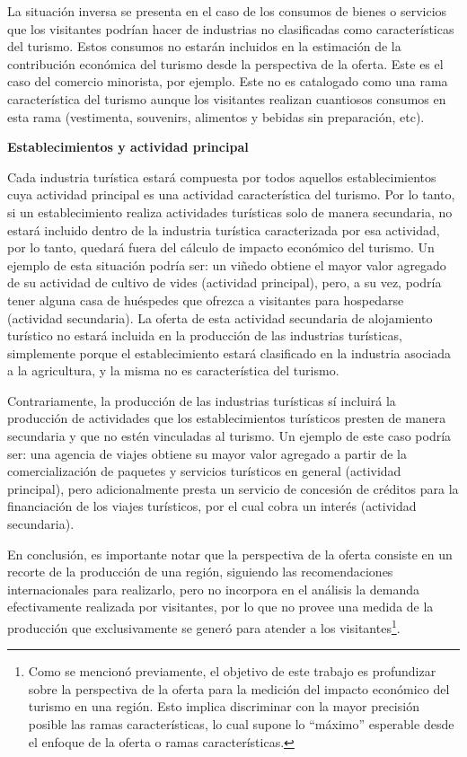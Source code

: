 \documentclass[
  openany]{book}
\begin{document}
La situación inversa se presenta en el caso de los consumos de bienes o servicios que los visitantes podrían hacer de industrias no clasificadas como características del turismo. Estos consumos no estarán incluidos en la estimación de la contribución económica del turismo desde la perspectiva de la oferta. Este es el caso del comercio minorista, por ejemplo. Este no es catalogado como una rama característica del turismo aunque los visitantes realizan cuantiosos consumos en esta rama (vestimenta, souvenirs, alimentos y bebidas sin preparación, etc).

\textbf{Establecimientos y actividad principal}

Cada industria turística estará compuesta por todos aquellos establecimientos cuya actividad principal es una actividad característica del turismo. Por lo tanto, si un establecimiento realiza actividades turísticas solo de manera secundaria, no estará incluido dentro de la industria turística caracterizada por esa actividad, por lo tanto, quedará fuera del cálculo de impacto económico del turismo. Un ejemplo de esta situación podría ser: un viñedo obtiene el mayor valor agregado de su actividad de cultivo de vides (actividad principal), pero, a su vez, podría tener alguna casa de huéspedes que ofrezca a visitantes para hospedarse (actividad secundaria). La oferta de esta actividad secundaria de alojamiento turístico no estará incluida en la producción de las industrias turísticas, simplemente porque el establecimiento estará clasificado en la industria asociada a la agricultura, y la misma no es característica del turismo.

Contrariamente, la producción de las industrias turísticas sí incluirá la producción de actividades que los establecimientos turísticos presten de manera secundaria y que no estén vinculadas al turismo. Un ejemplo de este caso podría ser: una agencia de viajes obtiene su mayor valor agregado a partir de la comercialización de paquetes y servicios turísticos en general (actividad principal), pero adicionalmente presta un servicio de concesión de créditos para la financiación de los viajes turísticos, por el cual cobra un interés (actividad secundaria).

En conclusión, es importante notar que la perspectiva de la oferta consiste en un recorte de la producción de una región, siguiendo las recomendaciones internacionales para realizarlo, pero no incorpora en el análisis la demanda efectivamente realizada por visitantes, por lo que no provee una medida de la producción que exclusivamente se generó para atender a los visitantes\footnote{Como se mencionó previamente, el objetivo de este trabajo es profundizar sobre la perspectiva de la oferta para la medición del impacto económico del turismo en una región. Esto implica discriminar con la mayor precisión posible las ramas características, lo cual supone lo ``máximo'' esperable desde el enfoque de la oferta o ramas características.}.
\end{document}

